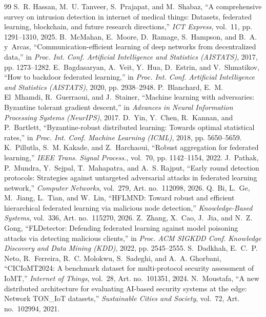 \documentclass[conference]{IEEEtran}
\begin{document}
\FloatBarrier
\begin{thebibliography}{99}
 S.~R. Hassan, M.~U. Tanveer, S.~Prajapat, and M.~Shabaz, ``A comprehensive survey on intrusion detection in internet of medical things: Datasets, federated learning, blockchain, and future research directions,'' \emph{ICT Express}, vol.~11, pp. 1291--1310, 2025.
 B.~McMahan, E.~Moore, D.~Ramage, S.~Hampson, and B.~A. y~Arcas, ``Communication-efficient learning of deep networks from decentralized data,'' in \emph{Proc. Int. Conf. Artificial Intelligence and Statistics (AISTATS)}, 2017, pp. 1273--1282.
 E.~Bagdasaryan, A.~Veit, Y.~Hua, D.~Estrin, and V.~Shmatikov, ``How to backdoor federated learning,'' in \emph{Proc. Int. Conf. Artificial Intelligence and Statistics (AISTATS)}, 2020, pp. 2938--2948.
 P.~Blanchard, E.~M. El~Mhamdi, R.~Guerraoui, and J.~Stainer, ``Machine learning with adversaries: Byzantine tolerant gradient descent,'' in \emph{Advances in Neural Information Processing Systems (NeurIPS)}, 2017.
 D.~Yin, Y.~Chen, R.~Kannan, and P.~Bartlett, ``Byzantine-robust distributed learning: Towards optimal statistical rates,'' in \emph{Proc. Int. Conf. Machine Learning (ICML)}, 2018, pp. 5650--5659.
 K.~Pillutla, S.~M. Kakade, and Z.~Harchaoui, ``Robust aggregation for federated learning,'' \emph{IEEE Trans. Signal Process.}, vol.~70, pp. 1142--1154, 2022.
 J.~Pathak, P.~Mundra, Y.~Sejpal, T.~Mahapatra, and A.~S. Rajput, ``Early round detection protocols: Strategies against untargeted adversarial attacks in federated learning network,'' \emph{Computer Networks}, vol.~279, Art. no.~112098, 2026.
 Q.~Bi, L.~Ge, M.~Jiang, L.~Tian, and W.~Lin, ``HFLMND: Toward robust and efficient hierarchical federated learning via malicious node detection,'' \emph{Knowledge-Based Systems}, vol.~336, Art. no.~115270, 2026.
 Z.~Zhang, X.~Cao, J.~Jia, and N.~Z. Gong, ``FLDetector: Defending federated learning against model poisoning attacks via detecting malicious clients,'' in \emph{Proc. ACM SIGKDD Conf. Knowledge Discovery and Data Mining (KDD)}, 2022, pp. 2545--2555.
 S.~Dadkhah, E.~C.~P. Neto, R.~Ferreira, R.~C. Molokwu, S.~Sadeghi, and A.~A. Ghorbani, ``CICIoMT2024: A benchmark dataset for multi-protocol security assessment of IoMT,'' \emph{Internet of Things}, vol.~28, Art. no.~101351, 2024.
 N.~Moustafa, ``A new distributed architecture for evaluating AI-based security systems at the edge: Network TON\_IoT datasets,'' \emph{Sustainable Cities and Society}, vol.~72, Art. no.~102994, 2021.

\end{thebibliography}
\end{document}
